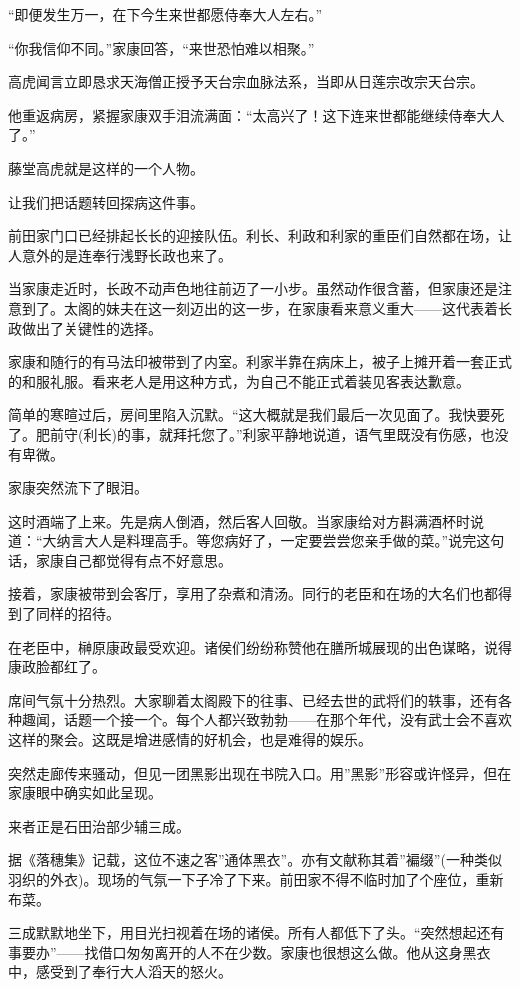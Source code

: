 \documentclass[
]{book}
\begin{document}
``即便发生万一，在下今生来世都愿侍奉大人左右。''

``你我信仰不同。''家康回答，``来世恐怕难以相聚。''

高虎闻言立即恳求天海僧正授予天台宗血脉法系，当即从日莲宗改宗天台宗。

他重返病房，紧握家康双手泪流满面：``太高兴了！这下连来世都能继续侍奉大人了。''

藤堂高虎就是这样的一个人物。

让我们把话题转回探病这件事。

前田家门口已经排起长长的迎接队伍。利长、利政和利家的重臣们自然都在场，让人意外的是连奉行浅野长政也来了。

当家康走近时，长政不动声色地往前迈了一小步。虽然动作很含蓄，但家康还是注意到了。太阁的妹夫在这一刻迈出的这一步，在家康看来意义重大------这代表着长政做出了关键性的选择。

家康和随行的有马法印被带到了内室。利家半靠在病床上，被子上摊开着一套正式的和服礼服。看来老人是用这种方式，为自己不能正式着装见客表达歉意。

简单的寒暄过后，房间里陷入沉默。``这大概就是我们最后一次见面了。我快要死了。肥前守(利长)的事，就拜托您了。''利家平静地说道，语气里既没有伤感，也没有卑微。

家康突然流下了眼泪。

这时酒端了上来。先是病人倒酒，然后客人回敬。当家康给对方斟满酒杯时说道：``大纳言大人是料理高手。等您病好了，一定要尝尝您亲手做的菜。''说完这句话，家康自己都觉得有点不好意思。

接着，家康被带到会客厅，享用了杂煮和清汤。同行的老臣和在场的大名们也都得到了同样的招待。

在老臣中，榊原康政最受欢迎。诸侯们纷纷称赞他在膳所城展现的出色谋略，说得康政脸都红了。

席间气氛十分热烈。大家聊着太阁殿下的往事、已经去世的武将们的轶事，还有各种趣闻，话题一个接一个。每个人都兴致勃勃------在那个年代，没有武士会不喜欢这样的聚会。这既是增进感情的好机会，也是难得的娱乐。

突然走廊传来骚动，但见一团黑影出现在书院入口。用''黑影''形容或许怪异，但在家康眼中确实如此呈现。

来者正是石田治部少辅三成。

据《落穗集》记载，这位不速之客''通体黑衣''。亦有文献称其着''褊缀''(一种类似羽织的外衣)。现场的气氛一下子冷了下来。前田家不得不临时加了个座位，重新布菜。

三成默默地坐下，用目光扫视着在场的诸侯。所有人都低下了头。``突然想起还有事要办''------找借口匆匆离开的人不在少数。家康也很想这么做。他从这身黑衣中，感受到了奉行大人滔天的怒火。
\end{document}
